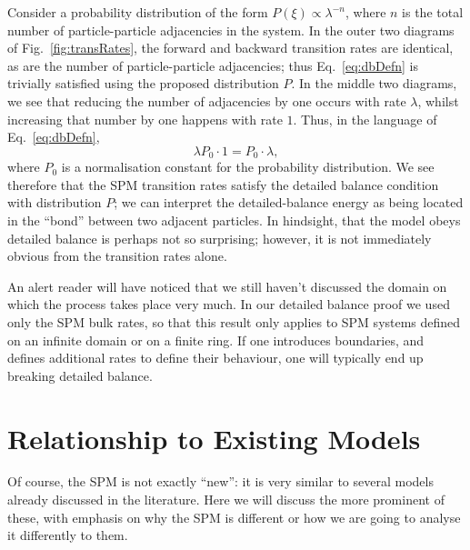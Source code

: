 Consider a probability distribution of the form $P(\xi) \propto \lambda^{-n}$, where $n$ is the total
number of particle-particle adjacencies in the system. In the outer two diagrams of 
Fig.~\ref{fig:transRates}, the forward and backward transition rates are identical, as are the number of
particle-particle adjacencies; thus Eq.~\eqref{eq:dbDefn} is trivially satisfied using the proposed 
distribution $P$. In the middle two diagrams, we see that reducing the number of adjacencies by one
occurs with rate $\lambda$, whilst increasing that number by one happens with rate $1$. Thus, in the 
language of Eq.~\eqref{eq:dbDefn},
\begin{equation}
 \lambda P_0 \cdot 1 = P_0 \cdot \lambda,
\end{equation}
where $P_0$ is a normalisation constant for the probability distribution. We see therefore that the SPM
transition rates satisfy the detailed balance condition with distribution $P$; we can interpret the 
detailed-balance energy as being located in the ``bond'' between two adjacent particles. In hindsight,
that the model obeys detailed balance is perhaps not so surprising; however, it is not immediately 
obvious from the transition rates alone.

An alert reader will have noticed that we still haven't discussed the domain on which the process takes 
place very much. In our detailed balance proof we used only the SPM bulk rates, 
so that this result only
applies to SPM systems defined on an infinite domain or on a finite ring. If one introduces boundaries,
and defines additional rates to define their behaviour, one will typically end up breaking detailed 
balance.

\section{Relationship to Existing Models} \label{sec:existingModels}
Of course, the SPM is not exactly ``new'': it is very similar to several models already discussed in the
literature. Here we will discuss the more prominent of these, with emphasis on why the SPM is different or
how we are going to analyse it differently to them.
